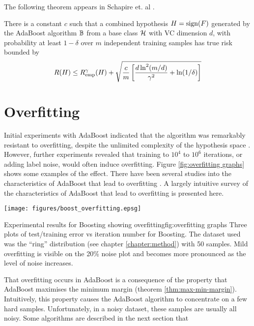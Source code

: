 The following theorem appears in Schapire et. al \cite{Schapire97}.

\begin{theorem}[Performance bound for boosting ($p$=1)]

There is a constant $c$ such that a combined hypothesis $H = \mathrm{sign}(F)$
generated by the AdaBoost algorithm $\mathbb{B}$ from a base class $\mathcal{H}$
with VC dimension $d$, with probability at least $1 - \delta$ over $m$
independent training samples has true risk bounded by 
\begin{equation}
R(H) \leq R_{\mathrm{emp}}^{\gamma}(H) + \sqrt{\frac{c}{m} \left[ \frac{d
\ln^2 (m/d)}{\gamma^2} + \ln(1/\delta) \right] }
\end{equation}
\end{theorem}


\section{Overfitting}
\label{sec:boost overfitting}

Initial experiments with AdaBoost indicated that the algorithm was
remarkably resistant to overfitting, despite the unlimited complexity
of the hypothesis space \cite{Freund96}.
However, further experiments \cite{Grove98, Bauer99} revealed that
training to $10^4$ to $10^6$ iterations, or adding label noise, would
often induce overfitting.  Figure \ref{fig:overfitting graphs} shows some
examples of the effect.  There have been several studies into the
characteristics of AdaBoost that lead to overfitting \cite{Schapire97,
Grove98, Ratsch98}.  A largely intuitive survey of the characteristics
of AdaBoost that lead to overfitting is presented here. 

\begin{linefigure}
\begin{center}
\texttt{[image: figures/boost\_overfitting.epsg]}
\end{center}
\begin{capt}{Experimental results for Boosting showing
overfitting}{fig:overfitting graphs}
Three plots of test/training error vs iteration number for Boosting.
The dataset used was the ``ring'' distribution (see chapter
\ref{chapter:method}) with 50 samples.  Mild overfitting is visible on
the 20\% noise plot and becomes more pronounced as the level of noise
increases.
\end{capt}
\end{linefigure}

That overfitting occurs in AdaBoost is a consequence of the property
that AdaBoost maximises the minimum margin (theorem
\ref{thm:max-min-margin}).  Intuitively, this property causes the 
AdaBoost algorithm to concentrate on a few hard samples.
Unfortunately, in a noisy dataset, these samples are usually all
noisy.  Some algorithms are described in the next section that 

